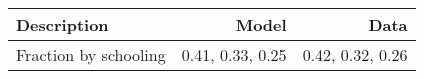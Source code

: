 \begin{tabular}{lrr}
\hline
Description & Model  & Data  \\ 
\hline
Fraction by schooling & 0.41, 0.33, 0.25  & 0.42, 0.32, 0.26  \\ 
\hline
\end{tabular}%
